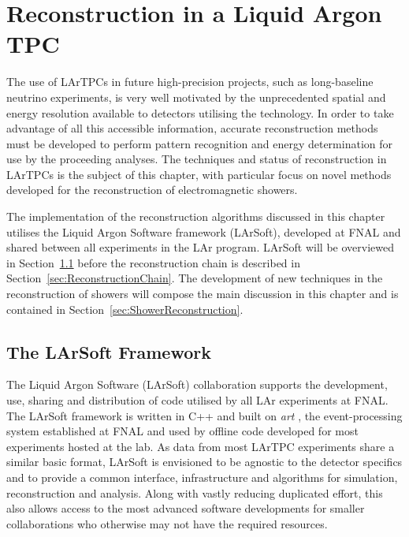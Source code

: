 
\graphicspath{{LArTPCReconstruction/Figs/}}

\chapter{Reconstruction in a Liquid Argon TPC}\label{chap:LArTPCReconstruction}

The use of LArTPCs in future high-precision projects, such as long-baseline neutrino experiments, is very well motivated by the unprecedented spatial and energy resolution available to detectors utilising the technology.  In order to take advantage of all this accessible information, accurate reconstruction methods must be developed to perform pattern recognition and energy determination for use by the proceeding analyses.  The techniques and status of reconstruction in LArTPCs is the subject of this chapter, with particular focus on novel methods developed for the reconstruction of electromagnetic showers.

The implementation of the reconstruction algorithms discussed in this chapter utilises the Liquid Argon Software framework (LArSoft), developed at FNAL and shared between all experiments in the LAr program.  LArSoft will be overviewed in Section~\ref{sec:LArSoft} before the reconstruction chain is described in Section~\ref{sec:ReconstructionChain}.  The development of new techniques in the reconstruction of showers will compose the main discussion in this chapter and is contained in Section~\ref{sec:ShowerReconstruction}.

\section{The LArSoft Framework}\label{sec:LArSoft}

The Liquid Argon Software (LArSoft) \cite{LArSoftWebsite,LArSoft2013,LArSoft2016,Snider2016} collaboration supports the development, use, sharing and distribution of code utilised by all LAr experiments at FNAL.  The LArSoft framework is written in C++ and built on \textit{art} \cite{artWebsite,art2012}, the event-processing system established at FNAL and used by offline code developed for most experiments hosted at the lab.  As data from most LArTPC experiments share a similar basic format, LArSoft is envisioned to be agnostic to the detector specifics and to provide a common interface, infrastructure and algorithms for simulation, reconstruction and analysis.  Along with vastly reducing duplicated effort, this also allows access to the most advanced software developments for smaller collaborations who otherwise may not have the required resources.

